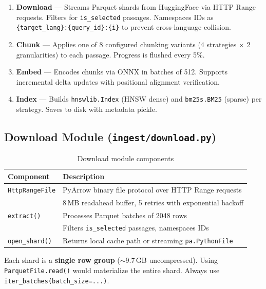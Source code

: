 \documentclass[12pt,a4paper]{article}
\begin{document}
\begin{enumerate}
    \item \textbf{Download} --- Streams Parquet shards from HuggingFace via HTTP Range requests. Filters for \texttt{is\_selected} passages. Namespaces IDs as \texttt{\{target\_lang\}:\{query\_id\}:\{i\}} to prevent cross-language collision.
    \item \textbf{Chunk} --- Applies one of 8 configured chunking variants (4 strategies $\times$ 2 granularities) to each passage. Progress is flushed every 5\%.
    \item \textbf{Embed} --- Encodes chunks via ONNX in batches of 512. Supports incremental delta updates with positional alignment verification.
    \item \textbf{Index} --- Builds \texttt{hnswlib.Index} (HNSW dense) and \texttt{bm25s.BM25} (sparse) per strategy. Saves to disk with metadata pickle.
\end{enumerate}

\subsection{Download Module (\texttt{ingest/download.py})}

\begin{table}[H]
\centering
\begin{tabular}{ll}
\toprule
\textbf{Component} & \textbf{Description} \\
\midrule
\texttt{HttpRangeFile}  & PyArrow binary file protocol over HTTP Range requests \\
                        & 8\,MB readahead buffer, 5 retries with exponential backoff \\
\texttt{extract()}      & Processes Parquet batches of 2048 rows \\
                        & Filters \texttt{is\_selected} passages, namespaces IDs \\
\texttt{open\_shard()}  & Returns local cache path or streaming \texttt{pa.PythonFile} \\
\bottomrule
\end{tabular}
\caption{Download module components}
\end{table}

\begin{warningbox}
Each shard is a \textbf{single row group} ($\sim$9.7\,GB uncompressed). Using \texttt{ParquetFile.read()} would materialize the entire shard. Always use \texttt{iter\_batches(batch\_size=...)}.
\end{warningbox}
\end{document}
